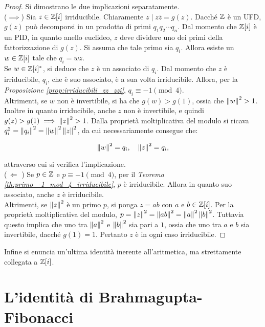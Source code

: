 \documentclass[11pt]{scrbook}
\begin{document}
\begin{proof} Si dimostrano le due implicazioni separatamente. \\

    ($\implies$)\; Sia $z \in \mathbb{Z}[i]$ irriducibile. Chiaramente
    $z \mid z \overline{z} = g(z)$. Dacché $\mathbb Z$ è un UFD,
    $g(z)$ può decomporsi in un prodotto di primi $q_1q_2\cdots q_n$.
    Dal momento che $\mathbb{Z}[i]$ è un PID, in quanto anello euclideo,
    $z$ deve dividere uno dei primi della fattorizzazione di
    $g(z)$. Si assuma che tale primo sia $q_i$. Allora esiste
    un $w \in \mathbb{Z}[i]$ tale che $q_i=wz$. \\

    Se $w \in \mathbb{Z}[i]^*$, si
    deduce che $z$ è un associato di $q_i$. Dal momento che
    $z$ è irriducibile, $q_i$, che è suo associato, è a sua
    volta irriducibile. Allora, per la \textit{Proposizione \ref{prop:irriducibili_zz_zzi}}, $q_i \equiv -1 \pmod4$.
    \\

    Altrimenti, se $w$ non è invertibile, si ha che $g(w)>g(1)$,
    ossia che $\left\lVert w \right\rVert^2>1$. Inoltre in quanto irriducibile, anche
    $z$ non è invertibile, e quindi
    $g(z)>g(1) \implies \left\lVert z \right\rVert^2>1$. Dalla proprietà
    moltiplicativa
    del modulo si ricava $q_i^2 = \left\lVert q_i \right\rVert^2 = \left\lVert w \right\rVert^2 \left\lVert z \right\rVert^2$,
    da cui necessariamente consegue che:

    \[ \left\lVert w \right\rVert^2=q_i, \quad \left\lVert z \right\rVert^2=q_i, \]

    attraverso cui si verifica l'implicazione. \\

    ($\,\Longleftarrow\,\,$)\; Se $p \in \mathbb Z$ e $p \equiv -1 \pmod4$, per
    il \textit{Teorema \ref{th:primo_-1_mod_4_irriducibile}}, $p$ è
    irriducibile. Allora in quanto suo associato, anche $z$ è irriducibile. \\

    Altrimenti, se $\left\lVert z \right\rVert^2$ è un primo $p$, si ponga
    $z=ab$ con $a$ e $b \in \mathbb{Z}[i]$. Per la proprietà moltiplicativa
    del modulo, $p = \left\lVert z \right\rVert^2 = \left\lVert ab \right\rVert^2 = \left\lVert a \right\rVert^2\left\lVert b \right\rVert^2$.
    Tuttavia questo implica che uno tra $\left\lVert a \right\rVert^2$ e $\left\lVert b \right\rVert^2$
    sia pari a $1$, ossia che uno tra $a$ e $b$ sia invertibile,
    dacché $g(1)=1$. Pertanto $z$ è in ogni caso irriducibile.
\end{proof}

Infine si enuncia un'ultima identità inerente all'aritmetica, ma
strettamente collegata a $\mathbb{Z}[i]$.

\section{L'identità di Brahmagupta-Fibonacci}
\end{document}
